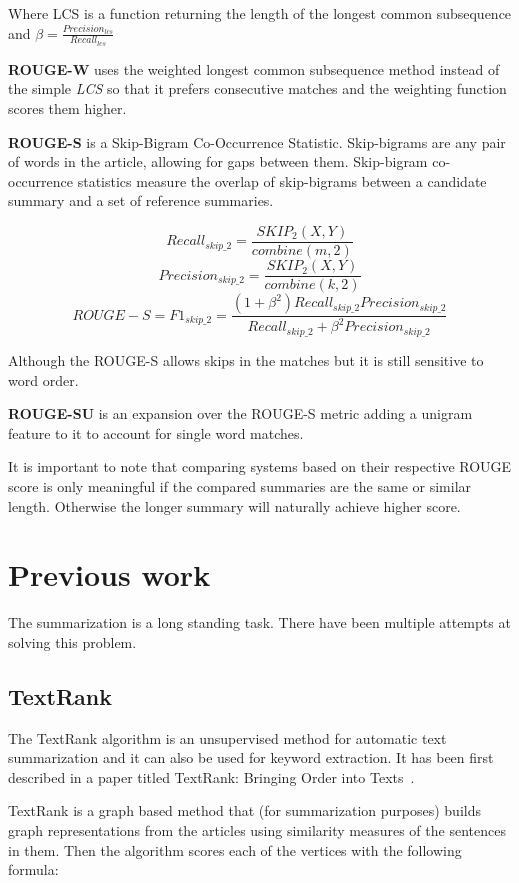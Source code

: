 Where LCS is a function returning the length of the longest common subsequence and \(\beta = \frac{Precision_{lcs}}{Recall_{lcs}}\)

\textbf{ROUGE-W} uses the weighted longest common subsequence method instead of the simple \textit{LCS} so that it prefers consecutive matches and the weighting function scores them higher.

\textbf{ROUGE-S} is a Skip-Bigram Co-Occurrence Statistic. Skip-bigrams are any pair of words in the article, allowing for gaps between them. Skip-bigram co-occurrence statistics measure the overlap of skip-bigrams between a candidate summary and a set of reference summaries.

\[Recall_{skip\_2} = \frac{SKIP_2(X, Y)}{combine(m, 2)}\]
\[Precision_{skip\_2} = \frac{SKIP_2(X, Y)}{combine(k, 2)}\]
\[ROUGE-S = F1_{skip\_2} = \frac{(1 + \beta^2)Recall_{skip\_2}Precision_{skip\_2}}{Recall_{skip\_2} + \beta^2Precision_{skip\_2}}\]

Although the ROUGE-S allows skips in the matches but it is still sensitive to word order.

\textbf{ROUGE-SU} is an expansion over the ROUGE-S metric adding a unigram feature to it to account for single word matches.

It is important to note that comparing systems based on their respective ROUGE score is only meaningful if the compared summaries are the same or similar length. Otherwise the longer summary will naturally achieve higher score.

\section{Previous work}
The summarization is a long standing task. There have been multiple attempts at solving this problem.

\subsection{TextRank}

The TextRank algorithm is an unsupervised method for automatic text summarization and it can also be used for keyword extraction. It has been first described in a paper titled TextRank: Bringing Order into Texts~\cite{TextRank:2004}.

TextRank is a graph based method that (for summarization purposes) builds graph representations from the articles using similarity measures of the sentences in them. Then the algorithm scores each of the vertices with the following formula:

